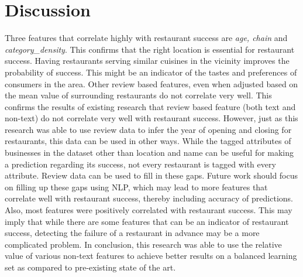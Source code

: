\documentclass[12pt]{article}
\begin{document}
  \section{Discussion}

  Three features that correlate highly with restaurant success are \emph{age, chain} and \emph{category\_density}. This confirms that the right location is essential for restaurant success. Having restaurants serving similar cuisines in the vicinity improves the probability of success. This might be an indicator of the tastes and preferences of consumers in the area. Other review based features, even when adjusted based on the mean value of surrounding restaurants do not correlate very well. This confirms the results of existing research that review based feature (both text and non-text) do not correlate very well with restaurant success. However, just as this research was able to use review data to infer the year of opening and closing for restaurants, this data can be used in other ways. While the tagged attributes of businesses in the dataset other than location and name can be useful for making a prediction regarding its success, not every restaurant is tagged with every attribute. Review data can be used to fill in these gaps. Future work should focus on filling up these gaps using NLP, which may lead to more features that correlate well with restaurant success, thereby including accuracy of predictions. Also, most features were positively correlated with restaurant success. This may imply that while there are some features that can be an indicator of restaurant success, detecting the failure of a restaurant in advance may be a more complicated problem. In conclusion, this research was able to use the relative value of various non-text features to achieve better results on a balanced learning set as compared to pre-existing state of the art.

  \printbibliography
\end{document}
